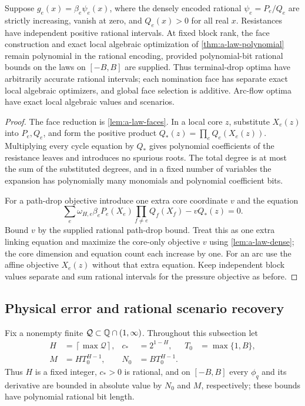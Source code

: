 \begin{lemma}
\label{lem:a-law-rational-core}
Suppose $g_e(x)=\beta_e\psi_e(x)$, where the densely encoded rational
$\psi_e=P_e/Q_e$ are strictly increasing, vanish at zero, and
$Q_e(x)>0$ for all real $x$. Resistances have independent positive
rational intervals. At fixed block rank, the face construction and
exact local algebraic optimization of \cref{thm:a-law-polynomial}
remain polynomial in the rational encoding, provided polynomial-bit
rational bounds on the laws on $[-B,B]$ are supplied. Thus terminal-drop optima have arbitrarily accurate rational intervals;
each nomination face has separate exact local algebraic optimizers, and
global face selection is additive. Arc-flow optima have exact local
algebraic values and scenarios.
\end{lemma}
\begin{proof}
The face reduction is \cref{lem:a-law-faces}. In a local core $z$,
substitute $X_e(z)$ into $P_e,Q_e$, and form the positive product
$Q_*(z)=\prod_e Q_e(X_e(z))$. Multiplying every cycle equation by $Q_*$
gives polynomial coefficients of the resistance leaves and introduces
no spurious roots. The total degree is at most the sum of the substituted
degrees, and in a fixed number of variables the expansion has polynomially
many monomials and polynomial coefficient bits.

For a path-drop objective introduce one extra core coordinate $v$ and
the equation
\[
 \sum_e\omega_{H,e}\beta_e P_e(X_e)
           \prod_{f\ne e}Q_f(X_f)-vQ_*(z)=0.
\]
Bound $v$ by the supplied rational path-drop bound. Treat this as one
extra linking equation and maximize the core-only objective $v$ using
\cref{lem:a-law-dense}; the core dimension and equation count each
increase by one. For an arc use the affine objective $X_e(z)$
without that extra equation. Keep independent block values separate
and sum rational intervals for the pressure objective as before.
\end{proof}

\subsection{Physical error and rational scenario recovery}
Fix a nonempty finite $\mathcal Q\subset\mathbb{Q}\cap(1,\infty)$. Throughout
this subsection let
\begin{align*}
 H&=\left\lceil\max\mathcal Q\right\rceil,&
 c_*&=2^{1-H},& T_0&=\max\{1,B\},\\
 M&=H T_0^{H-1},& N_0&=B T_0^{H-1}.
\end{align*}
Thus $H$ is a fixed integer, $c_*>0$ is rational, and on $[-B,B]$ every
$\phi_q$ and its derivative are bounded in absolute value by $N_0$ and
$M$, respectively; these bounds have polynomial rational bit length.


